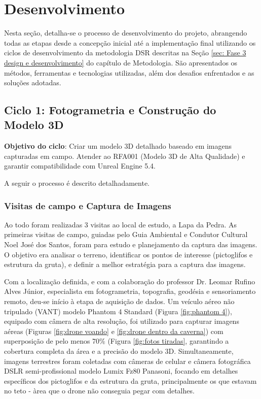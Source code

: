 \chapter{Desenvolvimento}
\label{cap:desenvolvimento}

Nesta seção, detalha-se o processo de desenvolvimento do projeto, abrangendo todas as etapas desde a concepção inicial até a implementação final utilizando os ciclos de desenvolvimento da metodologia DSR descritas na Seção \ref{sec: Fase 3 design e desenvolvimento} do capítulo de Metodologia. São apresentados os métodos, ferramentas e tecnologias utilizadas, além dos desafios enfrentados e as soluções adotadas.


\section{Ciclo 1: Fotogrametria e Construção do Modelo 3D}
\label{sec:ciclo1_fotogrametria}

\textbf{Objetivo do ciclo}: Criar um modelo 3D detalhado baseado em imagens capturadas em campo. Atender ao RFA001 (Modelo 3D de Alta Qualidade) e garantir compatibilidade com Unreal Engine 5.4. 

A seguir o processo é descrito detalhadamente.
    \subsection{Visitas de campo e Captura de Imagens} 
    Ao todo foram realizadas 3 visitas ao local de estudo, a Lapa da Pedra. 
    As primeiras visitas de campo, guiadas pelo Guia Ambiental e Condutor Cultural Noel José dos Santos, foram para estudo e planejamento da captura das imagens. O objetivo era analisar o terreno, identificar os pontos de interesse (pictoglifos e estrutura da gruta), e definir a melhor estratégia para a captura das imagens.

    Com a localização definida, e com a colaboração do professor Dr. Leomar Rufino Alves Júnior, especialista em fotogrametria, topografia, geodésia e sensoriamento remoto, deu-se início à etapa de aquisição de dados. Um veículo aéreo não tripulado (VANT) modelo Phantom 4 Standard (Figura \ref{fig:phantom 4}), equipado com câmera de alta resolução, foi utilizado para capturar imagens aéreas (Figuras \ref{fig:drone voando} e \ref{fig:drone dentro da caverna}) com superposição de pelo menos 70\% (Figura \ref{fig:fotos tiradas}, garantindo a cobertura completa da área e a precisão do modelo 3D. Simultaneamente, imagens terrestres foram coletadas com câmeras de celular e câmera fotográfica DSLR semi-profissional modelo Lumix Fz80 Panasoni, focando em detalhes específicos dos pictoglifos e da estrutura da gruta, principalmente os que estavam no teto - àrea que o drone não conseguia pegar com detalhes.

